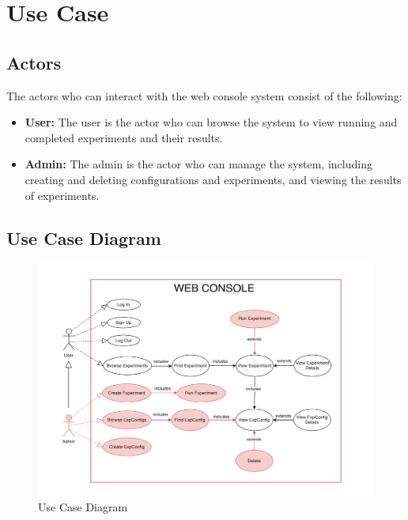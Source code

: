\newpage
\section{Use Case}
\subsection{Actors}

The actors who can interact with the web console system consist of the following:
\begin{itemize}
    \item \textbf{User:} The user is the actor who can browse the system to view running and completed experiments and their results.
    \item \textbf{Admin:} The admin is the actor who can manage the system, including creating and deleting configurations and experiments, and viewing the results of experiments.
\end{itemize}

\subsection{Use Case Diagram}
\begin{figure}[ht!]
    \centering
    \includegraphics[width=\textwidth]{images/2_analisys/FL_use_case.png}
    \caption{Use Case Diagram}
    \label{fig:use_case_diagram}
\end{figure}

\newpage
